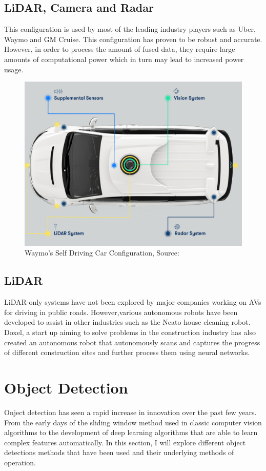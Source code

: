 \subsection{LiDAR, Camera and Radar}
This configuration is used by most of the leading industry players such as Uber, Waymo and GM Cruise. This configuration has proven to be robust and accurate. However, in order to process the amount of fused data, they require large amounts of computational power which in turn may lead to increased power usage. 
\begin{figure}[t]
	\centering
	\includegraphics[width=\textwidth]{media/waymo.png}
	\caption{Waymo's Self Driving Car Configuration, Source:\cite{waymo_2018}}
	\label{fig:waymo}
\end{figure}
\subsection{LiDAR }
LiDAR-only systems have not been explored by major companies working on AVs for driving in public roads. However,various autonomous robots have been developed to assist in other industries such as the Neato house cleaning robot. Doxel, a start up aiming to solve problems in the construction industry has also created an autonomous robot that autonomously scans and captures the progress of different construction sites and further process them using neural networks.
\section{Object  Detection} 
Onject detection has seen a rapid increase in innovation over the past few years. From the early days of the sliding window method used in classic computer vision algorithms to the development of deep learning algorithms that are able to learn complex features automatically. 
In this section, I will explore different object detections methods that have been used and their underlying methods of operation.

